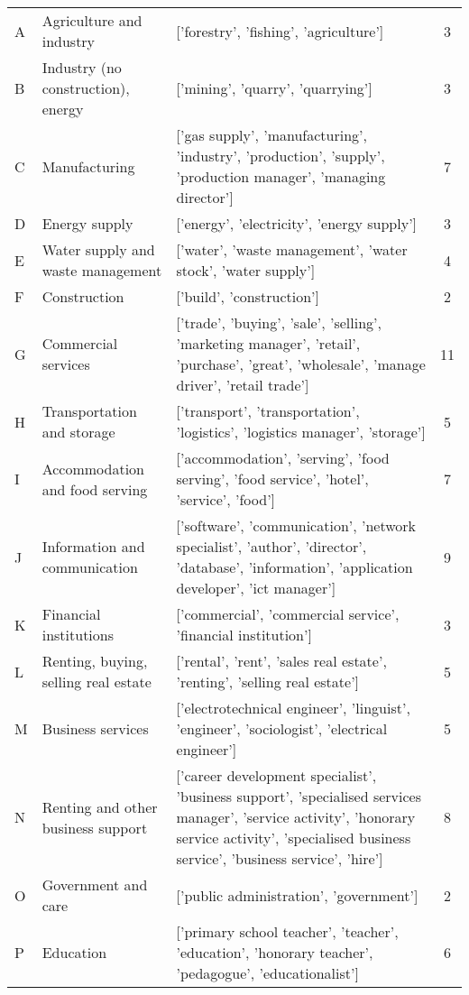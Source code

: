 \documentclass[man]{apa7}
\begin{document}
\begin{table}
\begin{longtable}{@{}L{0.05}L{0.25}L{0.5}C{0.1}@{}}
        A & Agriculture and industry & ['forestry', 'fishing', 'agriculture'] & 3 \\
        B & Industry (no construction), energy & ['mining', 'quarry', 'quarrying'] & 3 \\
        C & Manufacturing & ['gas supply', 'manufacturing', 'industry', 'production', 'supply', 'production manager', 'managing director'] & 7 \\
        D & Energy supply & ['energy', 'electricity', 'energy supply'] & 3 \\
        E & Water supply and waste management & ['water', 'waste management', 'water stock', 'water supply'] & 4 \\
        F & Construction & ['build', 'construction'] & 2 \\
        G & Commercial services & ['trade', 'buying', 'sale', 'selling', 'marketing manager', 'retail', 'purchase', 'great', 'wholesale', 'manage driver', 'retail trade'] & 11 \\
        H & Transportation and storage & ['transport', 'transportation', 'logistics', 'logistics manager', 'storage'] & 5 \\
        I & Accommodation and food serving & ['accommodation', 'serving', 'food serving', 'food service', 'hotel', 'service', 'food'] & 7 \\
        J & Information and communication & ['software', 'communication', 'network specialist', 'author', 'director', 'database', 'information', 'application developer', 'ict manager'] & 9 \\
        K & Financial institutions & ['commercial', 'commercial service', 'financial institution'] & 3 \\
        L & Renting, buying, selling real estate & ['rental', 'rent', 'sales real estate', 'renting', 'selling real estate'] & 5 \\
        M & Business services & ['electrotechnical engineer', 'linguist', 'engineer', 'sociologist', 'electrical engineer'] & 5 \\
        N & Renting and other business support & ['career development specialist', 'business support', 'specialised services manager', 'service activity', 'honorary service activity', 'specialised business service', 'business service', 'hire'] & 8 \\
        O & Government and care & ['public administration', 'government'] & 2 \\
        P & Education & ['primary school teacher', 'teacher', 'education', 'honorary teacher', 'pedagogue', 'educationalist'] & 6 \\

\end{longtable}
\end{table}
\end{document}
